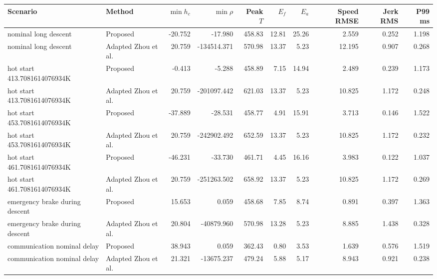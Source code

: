 \begin{tabular}{llrrrrrrrr}
\toprule
Scenario & Method & $\min h_c$ & $\min\rho$ & Peak $T$ & $E_f$ & $E_a$ & Speed RMSE & Jerk RMS & P99 ms \\
\midrule
nominal long descent & Proposed & -20.752 & -17.980 & 458.83 & 12.81 & 25.26 & 2.559 & 0.252 & 1.198 \\
nominal long descent & Adapted Zhou et al. & 20.759 & -134514.371 & 570.98 & 13.37 & 5.23 & 12.195 & 0.907 & 0.268 \\
hot start 413.7081614076934K & Proposed & -0.413 & -5.288 & 458.89 & 7.15 & 14.94 & 2.489 & 0.239 & 1.173 \\
hot start 413.7081614076934K & Adapted Zhou et al. & 20.759 & -201097.442 & 621.03 & 13.37 & 5.23 & 10.825 & 1.172 & 0.248 \\
hot start 453.7081614076934K & Proposed & -37.889 & -28.531 & 458.77 & 4.91 & 15.91 & 3.713 & 0.146 & 1.522 \\
hot start 453.7081614076934K & Adapted Zhou et al. & 20.759 & -242902.492 & 652.59 & 13.37 & 5.23 & 10.825 & 1.172 & 0.232 \\
hot start 461.7081614076934K & Proposed & -46.231 & -33.730 & 461.71 & 4.45 & 16.16 & 3.983 & 0.122 & 1.037 \\
hot start 461.7081614076934K & Adapted Zhou et al. & 20.759 & -251263.502 & 658.92 & 13.37 & 5.23 & 10.825 & 1.172 & 0.269 \\
emergency brake during descent & Proposed & 15.653 & 0.059 & 458.68 & 7.85 & 8.74 & 0.891 & 0.397 & 1.363 \\
emergency brake during descent & Adapted Zhou et al. & 20.804 & -40879.960 & 570.98 & 13.28 & 5.23 & 8.885 & 1.438 & 0.328 \\
communication nominal delay & Proposed & 38.943 & 0.059 & 362.43 & 0.80 & 3.53 & 1.639 & 0.576 & 1.519 \\
communication nominal delay & Adapted Zhou et al. & 21.321 & -13675.237 & 479.24 & 5.88 & 5.17 & 8.943 & 0.921 & 0.238 \\
\bottomrule
\end{tabular}
